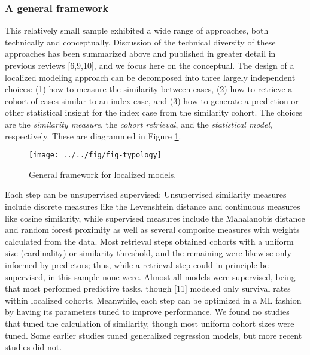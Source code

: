 \documentclass[preprint, 3p,
authoryear]{elsarticle} %
\begin{document}
\hypertarget{a-general-framework}{%
\subsubsection{A general framework}\label{a-general-framework}}

This relatively small sample exhibited a wide range of approaches, both
technically and conceptually. Discussion of the technical diversity of
these approaches has been summarized above and published in greater
detail in previous reviews {[}6,9,10{]}, and we focus here on the
conceptual. The design of a localized modeling approach can be
decomposed into three largely independent choices: (1) how to measure
the similarity between cases, (2) how to retrieve a cohort of cases
similar to an index case, and (3) how to generate a prediction or other
statistical insight for the index case from the similarity cohort. The
choices are the \emph{similarity measure}, the \emph{cohort retrieval},
and the \emph{statistical model}, respectively. These are diagrammed in
Figure \ref{fig:framework}.

\begin{figure}

{\centering \texttt{[image: ../../fig/fig-typology]} 

}

\caption{General framework for localized models.}\label{fig:framework}
\end{figure}

Each step can be unsupervised supervised: Unsupervised similarity
measures include discrete measures like the Levenshtein distance and
continuous measures like cosine similarity, while supervised measures
include the Mahalanobis distance and random forest proximity as well as
several composite measures with weights calculated from the data. Most
retrieval steps obtained cohorts with a uniform size (cardinality) or
similarity threshold, and the remaining were likewise only informed by
predictors; thus, while a retrieval step could in principle be
supervised, in this sample none were. Almost all models were supervised,
being that most performed predictive tasks, though {[}11{]} modeled only
survival rates within localized cohorts. Meanwhile, each step can be
optimized in a ML fashion by having its parameters tuned to improve
performance. We found no studies that tuned the calculation of
similarity, though most uniform cohort sizes were tuned. Some earlier
studies tuned generalized regression models, but more recent studies did
not.
\end{document}
